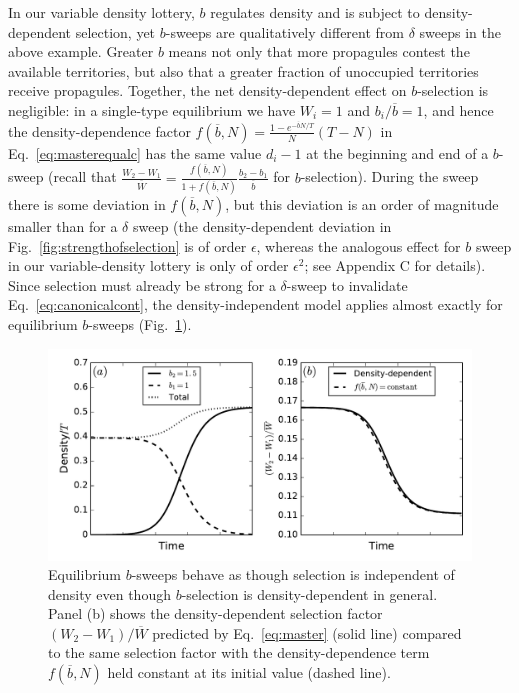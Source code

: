 \documentclass[12pt]{article}
\begin{document}
In our variable density lottery, $b$ regulates density and is subject to density-dependent selection, yet $b$-sweeps are qualitatively different from $\delta$ sweeps in the above example. Greater $b$ means not only that more propagules contest the available territories, but also that a greater fraction of unoccupied territories receive propagules. Together, the net density-dependent effect on $b$-selection is negligible: in a single-type equilibrium we have $W_i=1$ and $b_i/\overline{b}=1$, and hence the density-dependence factor $f(\overline{b},N)=\frac{1-e^{-\overline{b}N/T}}{N}(T-N)$ in Eq.~\eqref{eq:masterequalc} has the same value $d_i-1$ at the beginning and end of a $b$-sweep (recall that $\frac{W_2-W_1}{\overline{W}}=\frac{f(\overline{b},N)}{1+f(\overline{b},N)}\frac{b_2-b_1}{\overline{b}}$ for $b$-selection). During the sweep there is some deviation in $f(\overline{b},N)$, but this deviation is an order of magnitude smaller than for a $\delta$ sweep (the density-dependent deviation in Fig.~\ref{fig:strengthofselection} is of order $\epsilon$, whereas the analogous effect for $b$ sweep in our variable-density lottery is only of order $\epsilon^2$; see Appendix C for details). Since selection must already be strong for a $\delta$-sweep to invalidate Eq.~\eqref{eq:canonicalcont}, the density-independent model applies almost exactly for equilibrium $b$-sweeps (Fig.~\ref{fig:bsweep}).

\begin{figure}
\centering
\includegraphics[scale=0.8]{bsweep.pdf}
\caption{\label{fig:bsweep} Equilibrium $b$-sweeps behave as though selection is independent of density even though $b$-selection is density-dependent in general. Panel (b) shows the density-dependent selection factor $(W_2-W_1)/\overline{W}$ predicted by Eq.~\eqref{eq:master} (solid line) compared to the same selection factor with the density-dependence term $f(\overline{b},N)$ held constant at its initial value (dashed line).}
\end{figure}
\end{document}
